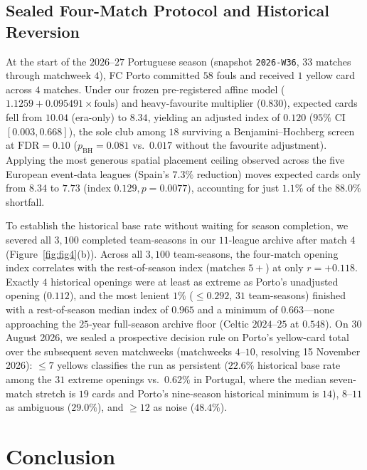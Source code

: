 \documentclass[10pt,twocolumn]{article}
\begin{document}
\subsection{Sealed Four-Match Protocol and Historical Reversion}
At the start of the $2026\text{--}27$ Portuguese season (snapshot \texttt{2026-W36}, $33$ matches through matchweek $4$), FC Porto committed $58$ fouls and received $1$ yellow card across $4$ matches. Under our frozen pre-registered affine model ($1.1259 + 0.095491 \times \text{fouls}$) and heavy-favourite multiplier ($0.830$), expected cards fell from $10.04$ (era-only) to $8.34$, yielding an adjusted index of $\mathbf{0.120}$ ($95\%$ CI $[0.003, 0.668]$), the sole club among $18$ surviving a Benjamini--Hochberg screen at $\text{FDR} = 0.10$ ($p_{\text{BH}} = 0.081$ vs.\ $0.017$ without the favourite adjustment). Applying the most generous spatial placement ceiling observed across the five European event-data leagues (Spain's $7.3\%$ reduction) moves expected cards only from $8.34$ to $7.73$ (index $0.129, p = 0.0077$), accounting for just $\mathbf{1.1\%}$ of the $88.0\%$ shortfall.

To establish the historical base rate without waiting for season completion, we severed all $3,100$ completed team-seasons in our $11$-league archive after match $4$ (Figure~\ref{fig:fig4}(b)). Across all $3,100$ team-seasons, the four-match opening index correlates with the rest-of-season index (matches $5+$) at only $r = \mathbf{+0.118}$. Exactly $4$ historical openings were at least as extreme as Porto's unadjusted opening ($0.112$), and the most lenient $1\%$ ($\le 0.292$, $31$ team-seasons) finished with a rest-of-season median index of $\mathbf{0.965}$ and a minimum of $\mathbf{0.663}$---none approaching the $25$-year full-season archive floor (Celtic $2024\text{--}25$ at $0.548$). On 30 August 2026, we sealed a prospective decision rule on Porto's yellow-card total over the subsequent seven matchweeks (matchweeks $4\text{--}10$, resolving 15 November 2026): $\le 7$ yellows classifies the run as persistent ($22.6\%$ historical base rate among the $31$ extreme openings vs.\ $0.62\%$ in Portugal, where the median seven-match stretch is $19$ cards and Porto's nine-season historical minimum is $14$), $8\text{--}11$ as ambiguous ($29.0\%$), and $\ge 12$ as noise ($48.4\%$).

\section{Conclusion}
\end{document}
